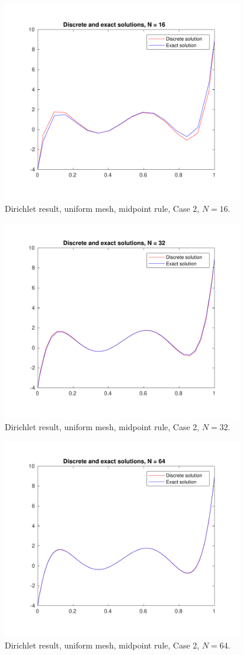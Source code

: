 \documentclass[a4paper]{article}
\numberwithin{equation}{section}
\begin{document}
\begin{figure}[H]
\centering\includegraphics[width=10.5cm]{fig_dirichlet_result_uniform_midpoint_N16_C2}
\caption{Dirichlet result, uniform mesh, midpoint rule, Case 2, $N=16$.}
\end{figure}
\begin{figure}[H]
\centering\includegraphics[width=10.5cm]{fig_dirichlet_result_uniform_midpoint_N32_C2}
\caption{Dirichlet result, uniform mesh, midpoint rule, Case 2, $N=32$.}
\end{figure}
\begin{figure}[H]
\centering\includegraphics[width=10.5cm]{fig_dirichlet_result_uniform_midpoint_N64_C2}
\caption{Dirichlet result, uniform mesh, midpoint rule, Case 2, $N=64$.}
\end{figure}
\end{document}
